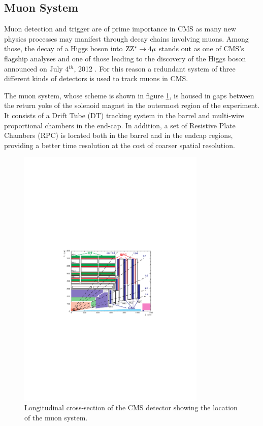 \subsection{Muon System}

Muon detection and trigger are of prime importance in CMS as many new physics processes may manifest through decay chains involving muons. Among those, the decay of a Higgs boson into $\mathrm{Z}\mathrm{Z}^*\rightarrow4\mu$ stands out as one of CMS's flagship analyses and one of those leading to the discovery of the Higgs boson announced on July 4$^{th}$, 2012 \cite{Chatrchyan:2013lba}. For this reason a redundant system of three different kinds of detectors is used to track muons in CMS. 

The muon system, whose scheme is shown in figure \ref{fig:mudet}, is housed in gaps between the return yoke of the solenoid magnet in the outermost region of the experiment. It consists of a Drift Tube (DT) tracking system in the barrel and multi-wire proportional chambers in the end-cap. In addition, a set of Resistive Plate Chambers (RPC) is located both in the barrel and in the endcap regions, providing a better time resolution  at the cost of coarser spatial resolution. 

\begin{figure}
\begin{center}
\includegraphics[angle=-0,width=0.8\textwidth]{2_LHC_and_CMS/pics/mudet.pdf}
\caption{Longitudinal cross-section of the CMS detector showing the location of the muon system.
\label{fig:mudet}
}
\end{center}
\end{figure}

